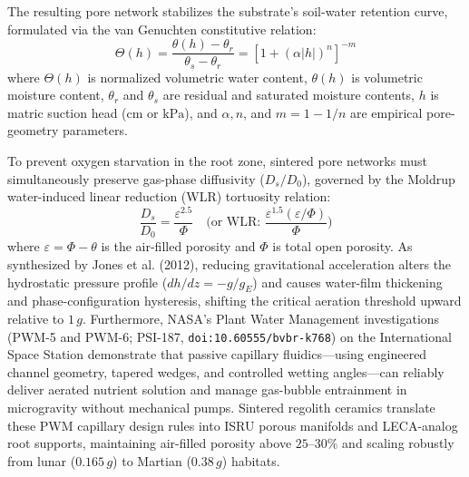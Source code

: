The resulting pore network stabilizes the substrate's soil-water retention curve, formulated via the van Genuchten constitutive relation\cite{vangenuchten1980closed,jones2012beyond,heinse2007measurement}:
\begin{equation}
    \Theta(h) = \frac{\theta(h) - \theta_r}{\theta_s - \theta_r} = \left[ 1 + \left(\alpha |h|\right)^n \right]^{-m}
    \label{eq:van_genuchten}
\end{equation}
where $\Theta(h)$ is normalized volumetric water content, $\theta(h)$ is volumetric moisture content, $\theta_r$ and $\theta_s$ are residual and saturated moisture contents, $h$ is matric suction head ($\mathrm{cm}$ or $\mathrm{kPa}$), and $\alpha, n$, and $m = 1 - 1/n$ are empirical pore-geometry parameters\cite{vangenuchten1980closed,jones2012beyond,heinse2007measurement}.

To prevent oxygen starvation in the root zone, sintered pore networks must simultaneously preserve gas-phase diffusivity ($D_s/D_0$), governed by the Moldrup water-induced linear reduction (WLR) tortuosity relation\cite{moldrup2000predicting,jones2012beyond,heinse2015microgravity}:
\begin{equation}
    \frac{D_s}{D_0} = \frac{\varepsilon^{2.5}}{\Phi} \quad \text{(or WLR: } \frac{\varepsilon^{1.5}(\varepsilon/\Phi)}{\Phi} \text{)}
    \label{eq:moldrup_diffusion}
\end{equation}
where $\varepsilon = \Phi - \theta$ is the air-filled porosity and $\Phi$ is total open porosity. As synthesized by Jones et al. (2012), reducing gravitational acceleration alters the hydrostatic pressure profile ($dh/dz = -g/g_E$) and causes water-film thickening and phase-configuration hysteresis, shifting the critical aeration threshold upward relative to $1\,g$\cite{jones2012beyond,heinse2007porous,heinse2015microgravity}. Furthermore, NASA's Plant Water Management investigations (PWM-5 and PWM-6; PSI-187, \texttt{doi:10.60555/bvbr-k768}) on the International Space Station demonstrate that passive capillary fluidics—using engineered channel geometry, tapered wedges, and controlled wetting angles—can reliably deliver aerated nutrient solution and manage gas-bubble entrainment in microgravity without mechanical pumps\cite{weislogel2026pwm,hatch2022pwm,pwm2020ntrs}. Sintered regolith ceramics translate these PWM capillary design rules into ISRU porous manifolds and LECA-analog root supports, maintaining air-filled porosity above $25\text{--}30\%$ and scaling robustly from lunar ($0.165\,g$) to Martian ($0.38\,g$) habitats\cite{jones2012beyond,weislogel2026pwm}.

